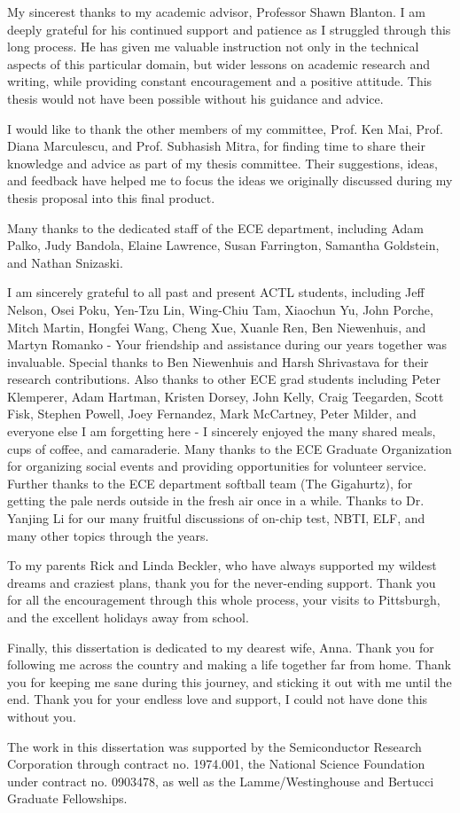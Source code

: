 My sincerest thanks to my academic advisor, Professor Shawn Blanton.
%
I am deeply grateful for his continued support and patience as I struggled through this long process.
%
He has given me valuable instruction not only in the technical aspects of this particular domain, but wider lessons on academic research and writing, while providing constant encouragement and a positive attitude.
%
This thesis would not have been possible without his guidance and advice.

I would like to thank the other members of my committee, Prof. Ken Mai, Prof. Diana Marculescu, and Prof. Subhasish Mitra, for finding time to share their knowledge and advice as part of my thesis committee.
%
Their suggestions, ideas, and feedback have helped me to focus the ideas we originally discussed during my thesis proposal into this final product.

Many thanks to the dedicated staff of the ECE department, including Adam Palko, Judy Bandola, Elaine Lawrence, Susan Farrington, Samantha Goldstein, and Nathan Snizaski.
%


I am sincerely grateful to all past and present ACTL students, including Jeff Nelson, Osei Poku, Yen-Tzu Lin, Wing-Chiu Tam, Xiaochun Yu, John Porche, Mitch Martin, Hongfei Wang, Cheng Xue, Xuanle Ren, Ben Niewenhuis, and Martyn Romanko - Your friendship and assistance during our years together was invaluable.
%
Special thanks to Ben Niewenhuis and Harsh Shrivastava for their research contributions.
%
Also thanks to other ECE grad students including Peter Klemperer, Adam Hartman, Kristen Dorsey, John Kelly, Craig Teegarden, Scott Fisk, Stephen Powell, Joey Fernandez, Mark McCartney, Peter Milder, and everyone else I am forgetting here - I sincerely enjoyed the many shared meals, cups of coffee, and camaraderie.
%
Many thanks to the ECE Graduate Organization for organizing social events and providing opportunities for volunteer service.
%
Further thanks to the ECE department softball team (The Gigahurtz), for getting the pale nerds outside in the fresh air once in a while.
%
Thanks to Dr. Yanjing Li for our many fruitful discussions of on-chip test, NBTI, ELF, and many other topics through the years.

To my parents Rick and Linda Beckler, who have always supported my wildest dreams and craziest plans, thank you for the never-ending support.
%
Thank you for all the encouragement through this whole process, your visits to Pittsburgh, and the excellent holidays away from school.

Finally, this dissertation is dedicated to my dearest wife, Anna.
%
Thank you for following me across the country and making a life together far from home.
%
Thank you for keeping me sane during this journey, and sticking it out with me until the end.
%
Thank you for your endless love and support, I could not have done this without you.

\sectionline

The work in this dissertation was supported by the Semiconductor Research Corporation through contract no. 1974.001, the National Science Foundation under contract no. 0903478, as well as the Lamme/Westinghouse and Bertucci Graduate Fellowships.

